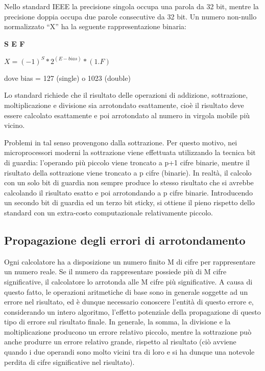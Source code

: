 Nello standard IEEE la precisione singola occupa una parola da 32 bit, mentre la precisione doppia occupa due parole consecutive da 32 bit. Un numero non-nullo normalizzato ``X'' ha la seguente rappresentazione binaria:

\begin{center}
	\textbf{S E F}
\end{center}

$X  =  (-1)^S  *  2^(E-bias)  *  (1.F)$

dove bias = 127 (single) o 1023 (double)

Lo standard richiede che il risultato delle operazioni di addizione, sottrazione, moltiplicazione e divisione sia arrotondato esattamente, cioè il risultato deve essere calcolato esattamente e poi arrotondato al numero in virgola mobile più vicino.

Problemi in tal senso provengono dalla sottrazione. Per questo motivo, nei microprocessori moderni la sottrazione viene effettuata utilizzando la tecnica bit di guardia:  l'operando più piccolo viene troncato a p+1 cifre binarie, mentre il risultato della sottrazione viene troncato a p cifre (binarie). In realtà, il calcolo con un solo bit di guardia non sempre produce lo stesso risultato che si avrebbe calcolando il risultato esatto e poi arrotondando a p cifre binarie. Introducendo un secondo bit di guardia ed un terzo bit sticky, si ottiene il pieno rispetto dello standard con un extra-costo computazionale relativamente piccolo.

\subsection{Propagazione degli errori di arrotondamento}

Ogni calcolatore ha a disposizione un numero finito M di cifre per rappresentare un numero reale. Se il numero da rappresentare possiede più di M cifre significative, il calcolatore lo arrotonda alle M cifre più significative. A causa di questo fatto, le operazioni aritmetiche di base sono in generale soggette ad un errore nel risultato, ed è dunque necessario conoscere l’entità di questo errore e, considerando un intero algoritmo,  l’effetto potenziale della propagazione di questo tipo di errore sul risultato finale.
In generale, la somma, la divisione e la moltiplicazione producono un errore relativo piccolo, mentre la sottrazione può anche produrre un errore relativo grande, rispetto al risultato (ciò avviene quando i due operandi sono molto vicini tra di loro e si ha dunque una notevole perdita di cifre significative nel risultato).

